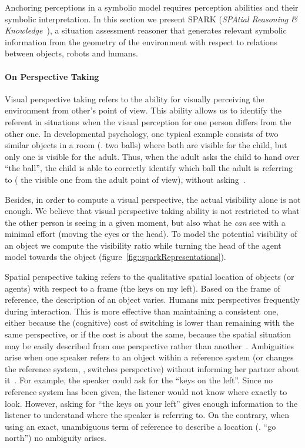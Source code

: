 Anchoring perceptions in a symbolic model requires perception abilities and
their symbolic interpretation. In this section we present SPARK (\emph{SPAtial
Reasoning \& Knowledge}~\cite{Sisbot2011}), a situation assessment reasoner
that generates relevant symbolic information from the geometry of the
environment with respect to relations between objects, robots and humans.

\paragraph{On Perspective Taking} Visual perspective taking refers to the
ability for visually perceiving the environment from other's point of view.
This ability allows us to identify the referent in situations when the visual
perception for one person differs from the other one. In developmental
psychology, one typical example consists of two similar objects in a room (\eg.
two balls) where both are visible for the child, but only one is  visible for
the adult. Thus, when the adult asks the child to hand over ``the ball'', the
child is able to correctly identify which ball the adult is referring to (\ie
the visible one from the adult point of view), without asking~\cite{Moll2006}.

Besides, in order to compute a visual perspective, the actual visibility alone
is not enough. We believe that visual perspective taking ability is not
restricted to what the other person is seeing in a given moment, but also what
he \emph{can} see with a minimal effort (moving the eyes or the head). To model
the potential visibility of an object we compute the visibility ratio while
turning the head of the agent model towards the object
(figure~\ref{fig::sparkRepresentations}).

Spatial perspective taking refers to the qualitative spatial location of
objects (or agents) with respect to a frame (\eg the keys on my left).  Based
on the frame of reference, the description of an object varies. Humans mix
perspectives frequently during interaction.  This is more effective than
maintaining a consistent one, either because the (cognitive) cost of switching
is lower than remaining with the same perspective, or if the cost is about the
same, because the spatial situation may be easily described from one
perspective rather than another~\cite{Tversky1999}. Ambiguities arise when one
speaker refers to an object within a reference system (or changes the reference
system, \ie, switches perspective) without informing her partner about
it~\cite{Breazeal2006, Ros2010}. For example, the speaker could ask for the
``keys on the left''. Since no reference system has been given, the listener
would not know where exactly to look.  However, asking for ``the keys on your
left'' gives enough information to the listener to understand where the speaker
is referring to. On the contrary, when using an exact, unambiguous term of
reference to describe a location (\eg. ``go north'') no ambiguity arises.

